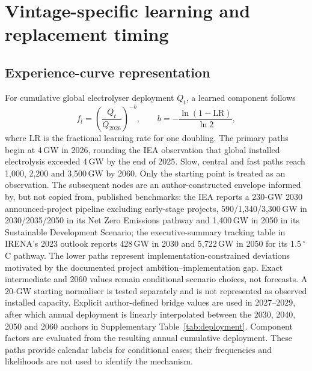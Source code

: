 \documentclass[pdflatex,sn-nature]{sn-jnl}
\begin{document}
\section{Vintage-specific learning and replacement timing}\label{sec:learning}

\subsection{Experience-curve representation}

For cumulative global electrolyser deployment $Q_t$, a learned component follows
\begin{equation}
f_t=\left(\frac{Q_t}{Q_{2026}}\right)^{-b}, \qquad
b=-\frac{\ln(1-\mathrm{LR})}{\ln 2},
\label{eq:learningcurve}
\end{equation}
where LR is the fractional learning rate for one doubling. The primary paths begin at 4\,GW in 2026, rounding the IEA observation that global installed electrolysis exceeded 4\,GW by the end of 2025\cite{iea2026}. Slow, central and fast paths reach 1,000, 2,200 and 3,500\,GW by 2060. Only the starting point is treated as an observation. The subsequent nodes are an author-constructed envelope informed by, but not copied from, published benchmarks: the IEA reports a 230-GW 2030 announced-project pipeline excluding early-stage projects, 590/1,340/3,300\,GW in 2030/2035/2050 in its Net Zero Emissions pathway and 1,400\,GW in 2050 in its Sustainable Development Scenario; the executive-summary tracking table in IRENA's 2023 outlook reports 428\,GW in 2030 and 5,722\,GW in 2050 for its 1.5\,$^\circ$C pathway\cite{ieaelectrolysers2024,iea2023nze,iea2021minerals,irena2023}. The lower paths represent implementation-constrained deviations motivated by the documented project ambition--implementation gap\cite{odenweller2025}. Exact intermediate and 2060 values remain conditional scenario choices, not forecasts. A 20-GW starting normaliser is tested separately and is not represented as observed installed capacity. Explicit author-defined bridge values are used in 2027--2029, after which annual deployment is linearly interpolated between the 2030, 2040, 2050 and 2060 anchors in Supplementary Table~\ref{tab:deployment}. Component factors are evaluated from the resulting annual cumulative deployment. These paths provide calendar labels for conditional cases; their frequencies and likelihoods are not used to identify the mechanism.
\end{document}
